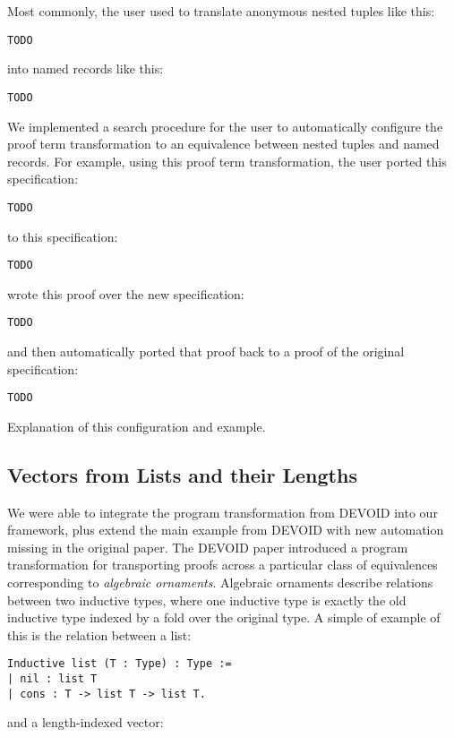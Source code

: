 Most commonly, the user used \toolname to translate anonymous nested tuples like this:

\begin{lstlisting}
TODO
\end{lstlisting}
into named records like this:

\begin{lstlisting}
TODO
\end{lstlisting}
We implemented a search procedure for the user to automatically configure the proof term transformation to an equivalence
between nested tuples and named records.
For example, using this proof term transformation, the user ported this specification:

\begin{lstlisting}
TODO
\end{lstlisting}
to this specification:

\begin{lstlisting}
TODO
\end{lstlisting}
wrote this proof over the new specification:

\begin{lstlisting}
TODO
\end{lstlisting}
and then automatically ported that proof back to a proof of the original specification:

\begin{lstlisting}
TODO
\end{lstlisting}

Explanation of this configuration and example.

\subsection{Vectors from Lists and their Lengths}
\label{sec:dep}

We were able to integrate the program transformation from DEVOID into our framework, plus extend
the main example from DEVOID with new automation missing in the original paper.
The DEVOID paper introduced a program transformation for transporting proofs across a particular class
of equivalences corresponding to \textit{algebraic ornaments}. Algebraic ornaments describe relations
between two inductive types, where one inductive type is exactly the old inductive type indexed by a fold
over the original type.
A simple of example of this is the relation between a list:

\begin{lstlisting}
Inductive list (T : Type) : Type :=
| nil : list T
| cons : T -> list T -> list T.
\end{lstlisting}
and a length-indexed vector:

